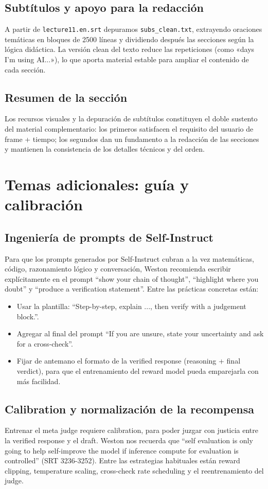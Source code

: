 \documentclass[a4paper]{article}
\begin{document}
\subsection{Subtítulos y apoyo para la redacción}
A partir de \texttt{lecture11.en.srt} depuramos \texttt{subs\_clean.txt}, extrayendo oraciones temáticas en bloques de 2500 líneas y dividiendo después las secciones según la lógica didáctica. La versión clean del texto reduce las repeticiones (como «days I'm using AI...»), lo que aporta material estable para ampliar el contenido de cada sección.

\subsection{Resumen de la sección}
Los recursos visuales y la depuración de subtítulos constituyen el doble sustento del material complementario: los primeros satisfacen el requisito del usuario de frame + tiempo; los segundos dan un fundamento a la redacción de las secciones y mantienen la consistencia de los detalles técnicos y del orden.

\section{Temas adicionales: guía y calibración}
\subsection{Ingeniería de prompts de Self-Instruct}
Para que los prompts generados por Self-Instruct cubran a la vez matemáticas, código, razonamiento lógico y conversación, Weston recomienda escribir explícitamente en el prompt ``show your chain of thought'', ``highlight where you doubt'' y ``produce a verification statement''. Entre las prácticas concretas están:
\begin{itemize}
    \item Usar la plantilla: ``Step-by-step, explain ..., then verify with a judgement block.''.
    \item Agregar al final del prompt ``If you are unsure, state your uncertainty and ask for a cross-check''.
    \item Fijar de antemano el formato de la verified response (reasoning + final verdict), para que el entrenamiento del reward model pueda emparejarla con más facilidad.
\end{itemize}
\mbox{}

\subsection{Calibration y normalización de la recompensa}
Entrenar el meta judge requiere calibration, para poder juzgar con justicia entre la verified response y el draft. Weston nos recuerda que ``self evaluation is only going to help self-improve the model if inference compute for evaluation is controlled'' (SRT 3236-3252). Entre las estrategias habituales están reward clipping, temperature scaling, cross-check rate scheduling y el reentrenamiento del judge.
\end{document}
